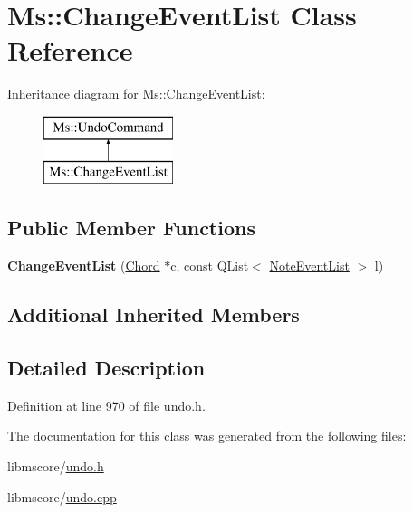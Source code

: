 \hypertarget{class_ms_1_1_change_event_list}{}\section{Ms\+:\+:Change\+Event\+List Class Reference}
\label{class_ms_1_1_change_event_list}
Inheritance diagram for Ms\+:\+:Change\+Event\+List\+:\begin{figure}[H]
\begin{center}
\leavevmode
\includegraphics[height=2.000000cm]{class_ms_1_1_change_event_list}
\end{center}
\end{figure}
\subsection*{Public Member Functions}
\begin{DoxyCompactItemize}
\item 
\mbox{\label{class_ms_1_1_change_event_list_a79bda558839323075a484f85661b1d27}} 
{\bfseries Change\+Event\+List} (\hyperlink{class_ms_1_1_chord}{Chord} $\ast$c, const Q\+List$<$ \hyperlink{class_ms_1_1_note_event_list}{Note\+Event\+List} $>$ l)
\end{DoxyCompactItemize}
\subsection*{Additional Inherited Members}


\subsection{Detailed Description}


Definition at line 970 of file undo.\+h.



The documentation for this class was generated from the following files\+:\begin{DoxyCompactItemize}
\item 
libmscore/\hyperlink{undo_8h}{undo.\+h}\item 
libmscore/\hyperlink{undo_8cpp}{undo.\+cpp}\end{DoxyCompactItemize}
